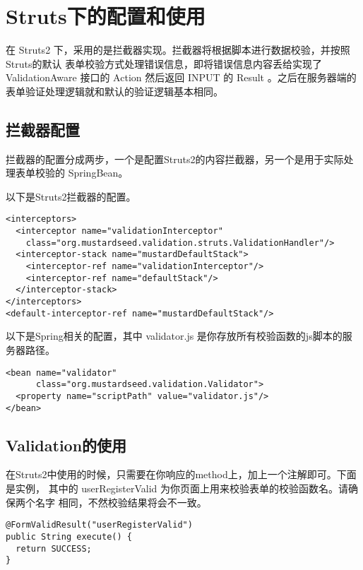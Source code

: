 \section{Struts下的配置和使用}
在 Struts2 下，采用的是拦截器实现。拦截器将根据脚本进行数据校验，并按照Struts的默认
表单校验方式处理错误信息，即将错误信息内容丢给实现了 ValidationAware 接口的 Action
然后返回 INPUT 的 Result 。之后在服务器端的表单验证处理逻辑就和默认的验证逻辑基本相同。

\subsection{拦截器配置}
拦截器的配置分成两步，一个是配置Struts2的内容拦截器，另一个是用于实际处理表单校验的
SpringBean。

以下是Struts2拦截器的配置。
\begin{verbatim}
<interceptors>
  <interceptor name="validationInterceptor"
    class="org.mustardseed.validation.struts.ValidationHandler"/>
  <interceptor-stack name="mustardDefaultStack">
    <interceptor-ref name="validationInterceptor"/>
    <interceptor-ref name="defaultStack"/>
  </interceptor-stack>
</interceptors>
<default-interceptor-ref name="mustardDefaultStack"/>
\end{verbatim}

以下是Spring相关的配置，其中 validator.js 是你存放所有校验函数的js脚本的服务器路径。
\begin{verbatim}
<bean name="validator"
      class="org.mustardseed.validation.Validator">
  <property name="scriptPath" value="validator.js"/>
</bean>
\end{verbatim}

\subsection{Validation的使用}

在Struts2中使用的时候，只需要在你响应的method上，加上一个注解即可。下面是实例，
其中的 userRegisterValid 为你页面上用来校验表单的校验函数名。请确保两个名字
相同，不然校验结果将会不一致。
\begin{verbatim}
@FormValidResult("userRegisterValid")
public String execute() {
  return SUCCESS;
}
\end{verbatim}

